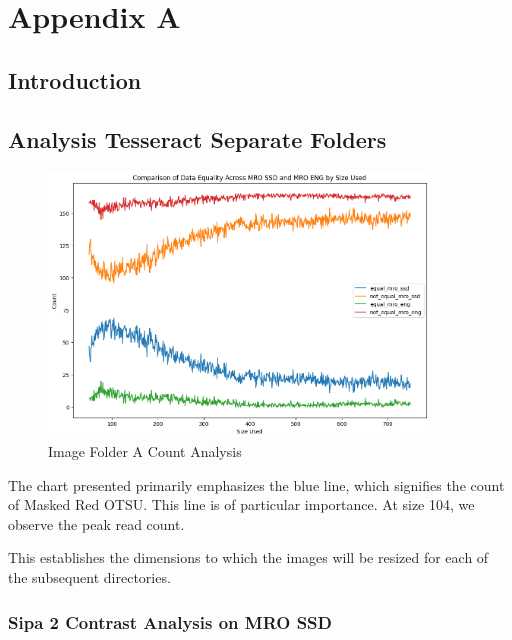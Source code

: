 \chapter{Appendix A}

\section{Introduction}

\section{Analysis Tesseract Separate Folders}



\begin{figure}[ht]
    \centering
    \includegraphics[width=0.9\textwidth]{Figures/Results/sipa_02/count_analysis.png}
    \caption[Count Analysis]{Image Folder A Count Analysis}
    \label{fig:Image Folder A Count Analysis}
\end{figure}

The chart presented primarily emphasizes the blue line, which signifies the count of Masked Red OTSU. This line is of particular importance. At size 104, we observe the peak read count.

This establishes the dimensions to which the images will be resized for each of the subsequent directories.

\newpage




\newpage

\subsection{Sipa 2 Contrast Analysis on MRO SSD}

